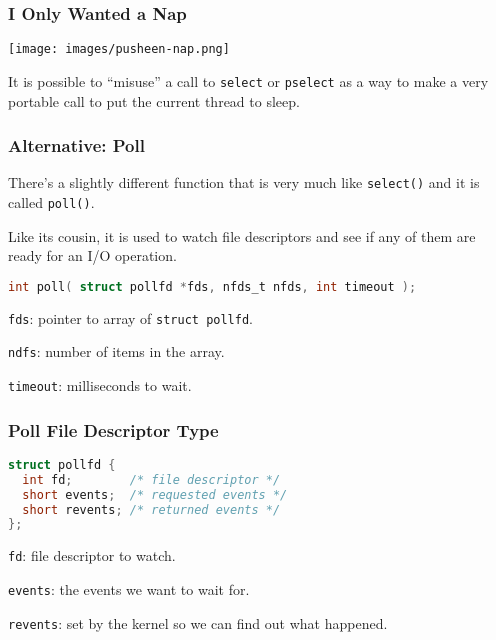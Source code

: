 \begin{frame}
	\frametitle{I Only Wanted a Nap}

	\begin{center}
		\texttt{[image: images/pusheen-nap.png]}
	\end{center}

	It is possible to ``misuse'' a call to \texttt{select} or \texttt{pselect} as a way to make a very portable call to put the current thread to sleep.

\end{frame}


\begin{frame}[fragile]
	\frametitle{Alternative: Poll}

	There's a slightly different function that is very much like \texttt{select()} and it is called \texttt{poll()}.

	Like its cousin, it is used to watch file descriptors and see if any of them are ready for an I/O operation.

	\begin{lstlisting}[language=C]
int poll( struct pollfd *fds, nfds_t nfds, int timeout );
\end{lstlisting}

	\texttt{fds}: pointer to array of  \texttt{struct pollfd}.

	\texttt{ndfs}: number of items in the array.

	\texttt{timeout}: milliseconds to wait.

\end{frame}

\begin{frame}[fragile]
	\frametitle{Poll File Descriptor Type}

	\begin{lstlisting}[language=C]
struct pollfd {
  int fd;        /* file descriptor */
  short events;  /* requested events */
  short revents; /* returned events */
};
\end{lstlisting}

	\texttt{fd}: file descriptor to watch.

	\texttt{events}: the events we want to wait for.

	\texttt{revents}: set by the kernel so we can find out what happened.

\end{frame}

